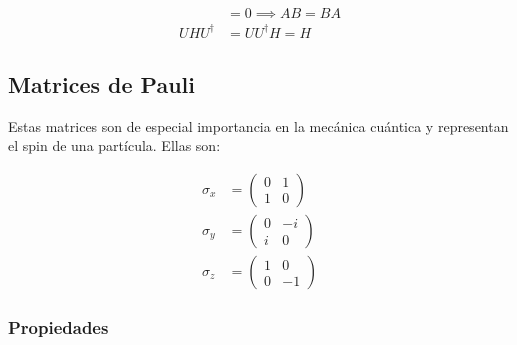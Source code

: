 \begin{align*}
    [A,B] &= 0 \implies A B = B A \\
    U H U^\dagger &= U U^\dagger H = H
\end{align*}


\subsection{Matrices de Pauli}

Estas matrices son de especial importancia en la mecánica cuántica y representan el spin de una partícula. Ellas son:

\begin{align}
    \sigma_x &=
        \begin{pmatrix}
            0 & 1 \\
            1 & 0
        \end{pmatrix} \\
    \sigma_y &=
        \begin{pmatrix}
            0 & -i \\
            i & 0
        \end{pmatrix} \\
    \sigma_z &=
        \begin{pmatrix}
            1 & 0 \\
            0 & -1
        \end{pmatrix}
\end{align}

\subsubsection{Propiedades}

